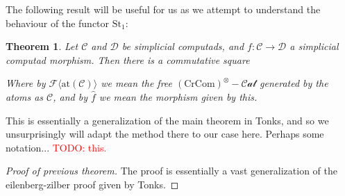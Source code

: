 \documentclass[12pt]{article}
\newtheorem{theorem}{Theorem}[section]
\theoremstyle{definition}
\newcommand{\TODO}[1]{\textcolor{red}{TODO: {#1}}}
\newcommand{\C}{\mathcal{C}}
\newcommand{\D}{\mathcal{D}}
\newcommand{\crcom}{\text{CrCom}}
\newcommand{\tensorcrossedcat}{(\crcom)^\otimes-\mathcal{Cat}}
\newcommand{\ssetcat}{(\text{sSet})-\text{Cat}}
\newcommand{\ob}{\text{ob}}
\begin{document}
		The following result will be useful for us as we attempt to understand the behaviour of the functor $\text{St}_1$:		
		\begin{theorem}
			Let $\C$ and $\D$ be simplicial computads, and $f: \C \to \D$ a simplicial computad morphism. Then there is a commutative square
			\begin{center}
			\end{center}
			Where by $\mathcal{F}\langle \text{at}(\C)\rangle $ we mean the free $\tensorcrossedcat$ generated by the atoms as $\C$, and by $\hat{f}$ we mean the morphism given by this.
		\end{theorem}
		This is essentially a generalization of the main theorem in Tonks, and so we unsurprisingly will adapt the method there to our case here. Perhaps some notation... \TODO{this.}
		\begin{proof}[Proof of previous theorem]
			The proof is essentially a vast generalization of the eilenberg-zilber proof given by Tonks. 
		\end{proof}
	
\end{document}
